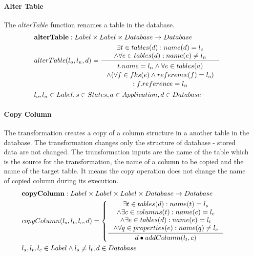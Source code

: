\documentclass[11pt]{article}
\begin{document}
\paragraph{Alter Table} The $alterTable$ function renames a table in  the database.
\begin{align*}
&	\mathbf{alterTable} : Label \times Label \times Database \rightarrow Database \\
&	alterTable(l_o, l_n, d) = \inference{\exists t \in tables(d) : name(d) = l_o \\ \wedge \forall e \in tables(d) : name(e) \neq l_n}{\begin{gathered}
		t.name = l_n \wedge \forall e \in tables(a) \\ \wedge ( \forall f \in fks(e) \wedge reference(f) = l_o ) \\ : f.reference = l_n 
	\end{gathered}}\\
&	l_o, l_n \in Label, s \in States, a \in Application, d \in Database
\end{align*}

\paragraph{Copy Column} The transformation creates a copy of a column structure in a another table in the database. The transformation changes only the structure of database - stored data are not changed. The transformation inputs are the name of the table which is the source for the transformation, the name of a column to be copied and the name of the target table. It means the copy operation does not change the name of copied column during its execution. 
\begin{align*}
&	\mathbf{copyColumn} : Label \times Label \times Label \times Database \rightarrow Database \\
&	copyColumn(l_s, l_t, l_c, d) = \begin{cases}
 		\inference{\exists t \in tables(d) : name(t) = l_s \\ \wedge \exists c \in columns(t) : name(c) = l_c \\ \wedge \exists e \in tables(d) : name(e) = l_t  \\ \wedge \forall q \in properties(e) : name(q) \neq l_c}{d \bullet addColumn(l_t, c)} 
	\end{cases} \\
&	l_s,l_t,l_c \in Label \wedge l_s \neq l_t,d \in Database
\end{align*}
\end{document}
